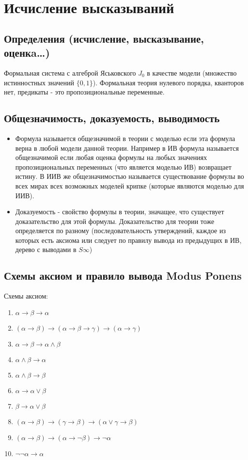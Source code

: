 \section{Исчисление высказываний}
\label{sec-3}
\subsection{Определения (исчисление, высказывание, оценкa\ldots{})}
\label{sec-3-1}
Формальная система с алгеброй Яськовского $J_{0}$ в качестве модели (множество
истинностных значений $\lbrace 0, 1 \rbrace$). Формальная теория нулевого порядка, кванторов
нет, предикаты - это пропозициональные переменные.
\subsection{Общезначимость, доказуемость, выводимость}
\label{sec-3-2}
\begin{itemize}
\item Формула называется общезначимой в теории с моделью если эта формула
верна в любой модели данной теории. Например в ИВ формула называется
общезначимой если любая оценка формулы на любых значениях пропозициональных
переменных (что является моделью ИВ) возвращает истину. В ИИВ же общезначимостью
называется существование формулы во всех мирах всех возможных моделей крипке
(которые являются моделью для ИИВ).
\item Доказуемость - свойство формулы в теории, значащее, что существует
доказательство для этой формулы. Доказательство для теории тоже определяется
по разному (последовательность утверждений, каждое из которых есть аксиома
или следует по правилу вывода из предыдущих в ИВ, дерево с выводами в $S\infty$)
\end{itemize}
\subsection{Схемы аксиом и правило вывода Modus Ponens}
\label{sec-3-3}
Схемы аксиом:
\begin{enumerate}
\item $\alpha \to \beta \to \alpha$
\item $(\alpha \to \beta) \to (\alpha \to \beta \to \gamma) \to (\alpha \to \gamma)$
\item $\alpha \to \beta \to \alpha \land \beta$
\item $\alpha \land \beta \to \alpha$
\item $\alpha \land \beta \to \beta$
\item $\alpha \to \alpha \lor \beta$
\item $\beta \to \alpha \lor \beta$
\item $(\alpha \to \beta) \to (\gamma \to \beta) \to (\alpha \lor \gamma \to \beta)$
\item $(\alpha \to \beta) \to (\alpha \to \lnot \beta) \to \lnot \alpha$
\item $\lnot \lnot \alpha \to \alpha$
\end{enumerate}

